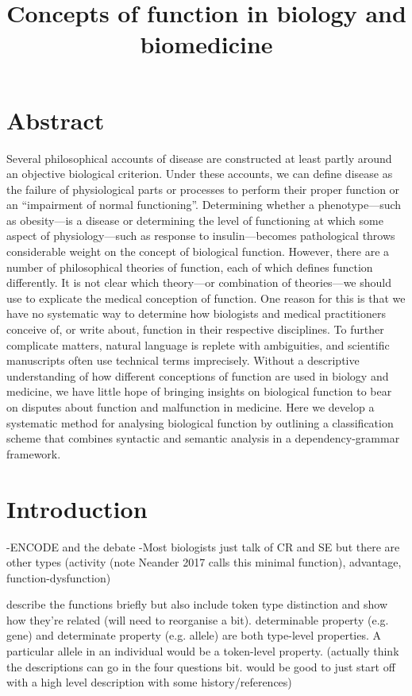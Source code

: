 \documentclass{article}
\title{Concepts of function in biology and biomedicine}
\begin{document}
\maketitle

\section{Abstract}
\label{sec:abstract}

Several philosophical accounts of disease are constructed at least partly around an objective biological criterion. Under these accounts, we can define disease as the failure of physiological parts or processes to perform their proper function or an ``impairment of normal functioning''. Determining whether a phenotype—such as obesity—is a disease or determining the level of functioning at which some aspect of physiology—such as response to insulin—becomes pathological throws considerable weight on the concept of biological function. However, there are a number of philosophical theories of function, each of which defines function differently. It is not clear which theory—or combination of theories—we should use to explicate the medical conception of function. One reason for this is that we have no systematic way to determine how biologists and medical practitioners conceive of, or write about, function in their respective disciplines. To further complicate matters, natural language is replete with ambiguities, and scientific manuscripts often use technical terms imprecisely. Without a descriptive understanding of how different conceptions of function are used in biology and medicine, we have little hope of bringing insights on biological function to bear on disputes about function and malfunction in medicine. Here we develop a systematic method for analysing biological function by outlining a classification scheme that combines syntactic and semantic analysis in a dependency-grammar framework.

\section{Introduction}
\label{sec:introduction}

-ENCODE and the debate
-Most biologists just talk of CR and SE but there are other types (activity (note Neander 2017 calls this minimal function), advantage, function-dysfunction)

describe the functions briefly but also include token type distinction and show how they're related (will need to reorganise a bit). determinable property (e.g. gene) and determinate property (e.g. allele) are both type-level properties. A particular allele in an individual would be a token-level property. (actually think the descriptions can go in the four questions bit. would be good to just start off with a high level description with some history/references)
\end{document}

